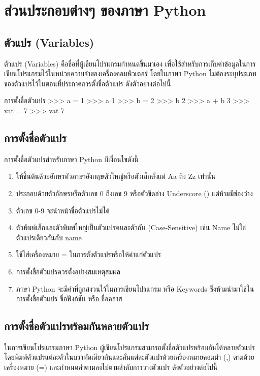 \chapter{ส่วนประกอบต่างๆ ของภาษา Python}

\section{ตัวแปร (Variables)}

ตัวแปร (Variables) คือชื่อที่ผู้เขียนโปรแกรมกำหนดขึ้นมาเอง เพื่อใช้สำหรับการเก็บค่าข้อมูลในการเขียนโปรแกรมไว้ในหน่วยความจำของเครื่องคอมพิวเตอร์ โดยในภาษา Python ไม่ต้องระบุประเภทของตัวแปรไว้ในตอนที่ประกาศการตั้งชื่อตัวแปร ดังตัวอย่างต่อไปนี้

\begin{codelist}{การตั้งชื่อตัวแปร}{}
>>> a = 1
>>> a
1
>>> b = 2
>>> b
2
>>> a + b
3
>>> vat = 7
>>> vat
7
\end{codelist}

\section{การตั้งชื่อตัวแปร}

การตั้งชื่อตัวแปรสำหรับภาษา Python มีเงื่อนไขดังนี้

\begin{enumerate}[noitemsep]
\item ให้ขึ้นต้นด้วยอักษรตัวภาษาอังกฤษตัวใหญ่หรือตัวเล็กตั้งแต่ Aa ถึง Zz เท่านั้น 
\item ประกอบด้วยตัวอักษรหรือตัวเลข 0 ถึงเลข 9 หรือตัวขีดล่าง Underscore (\pyinline{_}) แต่ห้ามมีช่องว่าง
\item ตัวเลข 0-9 จะนำหน้าชื่อตัวแปรไม่ได้
\item ตัวพิมพ์เล็กและตัวพิมพ์ใหญ่เป็นตัวแปรคนละตัวกัน (Case-Sensitive) เช่น Name ไม่ใช่ตัวแปรเดียวกันกับ name 
\item ใช้ใส่เครื่องหมาย = ในการตั้งตัวแปรหรือให้ค่าแก่ตัวแปร
\item การตั้งชื่อตัวแปรควรตั้งอย่างสมเหตุสมผล 
\item ภาษา Python จะมีคำที่ถูกสงวนไว้ในการเขียนโปรแกรม หรือ Keywords ซึ่งห้ามนำมาใช้ในการตั้งชื่อตัวแปร ชื่อฟังก์ชัน หรือ ชื่อคลาส 
\end{enumerate}

\section{การตั้งชื่อตัวแปรพร้อมกันหลายตัวแปร}

ในการเขียนโปรแกรมภาษา Python ผู้เขียนโปรแกรมสามารถตั้งชื่อตัวแปรพร้อมกันได้หลายตัวแปร โดยพิมพ์ตัวแปรแต่ละตัวในบรรทัดเดียวกันและคั่นแต่ละตัวแปรด้วยเครื่องหมายคอมม่า (,) ตามด้วยเครื่องหมาย (=) และกำหนดค่าตามลงไปตามลำดับการวางตัวแปร ดังตัวอย่างต่อไปนี้

